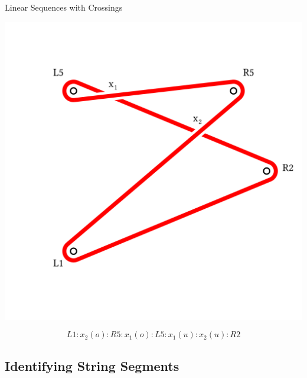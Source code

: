 \begin{frame}{Linear Sequences with Crossings}
\begin{adjustwidth}{-1.5em}{-1.5em}
\begin{center}
\includegraphics[width=0.7\columnwidth]{figures/star-pick.png}
\end{center}

$$
L1:x_2(o):R5:x_1(o):L5:x_1(u):x_2(u):R2
$$
\end{adjustwidth}
\end{frame}

\subsection{Identifying String Segments }

